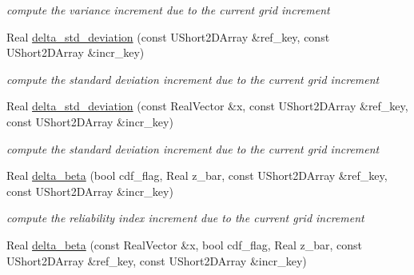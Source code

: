 \begin{DoxyCompactItemize}
\begin{DoxyCompactList}\small\item\em compute the variance increment due to the current grid increment \end{DoxyCompactList}\item 
Real \hyperlink{classPecos_1_1HierarchInterpPolyApproximation_aaf63c8320565d50ab4acf612438e93be}{delta\+\_\+std\+\_\+deviation} (const U\+Short2\+D\+Array \&ref\+\_\+key, const U\+Short2\+D\+Array \&incr\+\_\+key)\label{classPecos_1_1HierarchInterpPolyApproximation_aaf63c8320565d50ab4acf612438e93be}

\begin{DoxyCompactList}\small\item\em compute the standard deviation increment due to the current grid increment \end{DoxyCompactList}\item 
Real \hyperlink{classPecos_1_1HierarchInterpPolyApproximation_a3d0406d60c6804cb817a95cc61a5dd93}{delta\+\_\+std\+\_\+deviation} (const Real\+Vector \&x, const U\+Short2\+D\+Array \&ref\+\_\+key, const U\+Short2\+D\+Array \&incr\+\_\+key)\label{classPecos_1_1HierarchInterpPolyApproximation_a3d0406d60c6804cb817a95cc61a5dd93}

\begin{DoxyCompactList}\small\item\em compute the standard deviation increment due to the current grid increment \end{DoxyCompactList}\item 
Real \hyperlink{classPecos_1_1HierarchInterpPolyApproximation_a0f868257947afc0ce1b58d194bc414e8}{delta\+\_\+beta} (bool cdf\+\_\+flag, Real z\+\_\+bar, const U\+Short2\+D\+Array \&ref\+\_\+key, const U\+Short2\+D\+Array \&incr\+\_\+key)\label{classPecos_1_1HierarchInterpPolyApproximation_a0f868257947afc0ce1b58d194bc414e8}

\begin{DoxyCompactList}\small\item\em compute the reliability index increment due to the current grid increment \end{DoxyCompactList}\item 
Real \hyperlink{classPecos_1_1HierarchInterpPolyApproximation_a23bf48e6ed8ab2c0c04229866effa967}{delta\+\_\+beta} (const Real\+Vector \&x, bool cdf\+\_\+flag, Real z\+\_\+bar, const U\+Short2\+D\+Array \&ref\+\_\+key, const U\+Short2\+D\+Array \&incr\+\_\+key)\label{classPecos_1_1HierarchInterpPolyApproximation_a23bf48e6ed8ab2c0c04229866effa967}


\end{DoxyCompactItemize}
